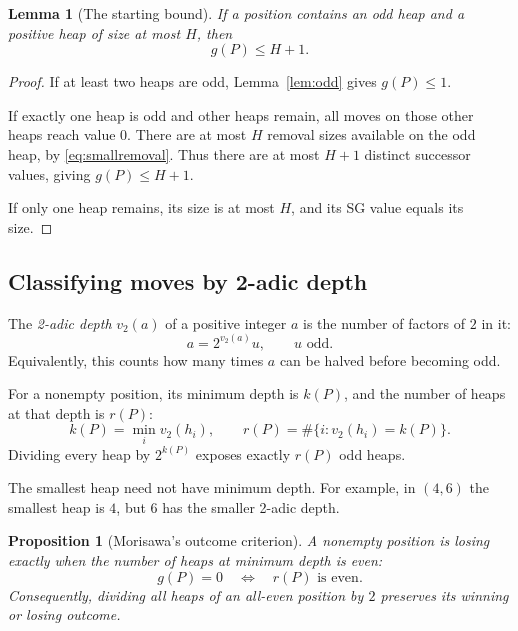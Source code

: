 \documentclass[10pt,a4paper]{article}
\newtheorem{lemma}[theorem]{Lemma}
\newtheorem{proposition}[theorem]{Proposition}
\begin{document}
\begin{lemma}[The starting bound]
\label{lem:base}
If a position contains an odd heap and a positive heap of
size at most $H$, then
\[
 g(P)\le H+1.
\]
\end{lemma}

\begin{proof}
If at least two heaps are odd, Lemma~\ref{lem:odd} gives
$g(P)\le1$.

If exactly one heap is odd and other heaps remain, all moves
on those other heaps reach value $0$. There are at most $H$
removal sizes available on the odd heap, by
\eqref{eq:smallremoval}. Thus there are at most $H+1$
distinct successor values, giving $g(P)\le H+1$.

If only one heap remains, its size is at most $H$, and its
SG value equals its size.
\end{proof}

\subsection{Classifying moves by 2-adic depth}

The \emph{2-adic depth} $v_2(a)$ of a positive integer $a$
is the number of factors of $2$ in it:
\[
 a=2^{v_2(a)}u,
 \qquad u\text{ odd}.
\]
Equivalently, this counts how many times $a$ can be halved
before becoming odd.

For a nonempty position, its minimum depth is $k(P)$, and
the number of heaps at that depth is $r(P)$:
\begin{equation}
 k(P)=\min_i v_2(h_i),
 \qquad
 r(P)=\#\{i:v_2(h_i)=k(P)\}.
 \label{eq:depth}
\end{equation}
Dividing every heap by $2^{k(P)}$ exposes exactly $r(P)$
odd heaps.

The smallest heap need not have minimum depth. For example,
in $(4,6)$ the smallest heap is $4$, but $6$ has the smaller
2-adic depth.

\begin{proposition}[Morisawa's outcome criterion]
\label{prop:halving}
A nonempty position is losing exactly when the number of heaps
at minimum depth is even:
\begin{equation}
 \boxed{
 g(P)=0
 \quad\Longleftrightarrow\quad
 r(P)\text{ is even}.
 }
 \label{eq:outcome}
\end{equation}
Consequently, dividing all heaps of an all-even position by
$2$ preserves its winning or losing outcome.
\end{proposition}
\end{document}
